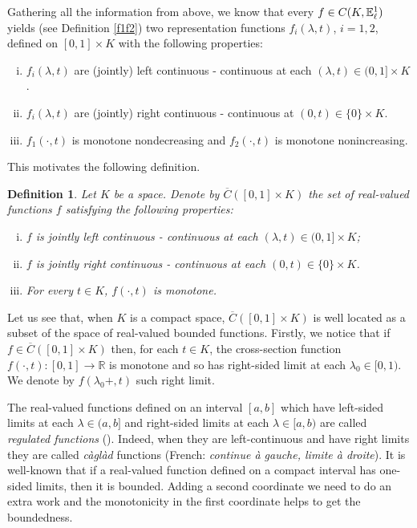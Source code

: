 \documentclass{amsart}
\newtheorem{definition}[theorem]{Definition}
\newcommand{\R}{{\mathbb{R}}}
\newcommand{\fn}{\mathbb{E}\sp{1}}
\begin{document}
\medskip
Gathering all the information from above, we know that every $f\in C(K, \fn_{\ell})$ yields (see Definition \ref{f1f2}) two representation functions
$f_i(\lambda,t)$, $i=1,2$, defined on $[0,1]\times K$ with the following properties:
\begin{enumerate}[(i)]
\item $f_i(\lambda,t)$ are (jointly) left continuous - continuous at each $(\lambda,t)\in(0,1]\times K$.
\item $f_i(\lambda,t)$ are (jointly) right continuous - continuous at $(0,t)\in \{0\}\times K$.
\item $f_1(\cdot,t)$ is monotone nondecreasing  and $f_2(\cdot,t)$ is monotone nonincreasing.
\end{enumerate}

This motivates the following definition.

\begin{definition} \label{mainDefinition}
Let $K$ be a space.
Denote by $\overline{C}([0,1]\times K)$ the set of real-valued functions $f$ satisfying the following properties:
\begin{enumerate}[(i)]
\item $f$ is jointly left continuous - continuous at each $(\lambda,t)\in(0,1]\times K$;
\item $f$ is jointly right continuous - continuous at each $(0,t)\in\{0\}\times K$.
\item For every $t\in K$, $f(\cdot,t)$ is monotone.
\end{enumerate}
\end{definition}

Let us see that, when $K$ is a compact space,  $\overline{C}([0,1]\times K)$ is well located as a subset of the space of real-valued bounded functions.
Firstly, we notice that if $f \in \overline{C}([0,1]\times K)$ then,
for each $t\in K$, the cross-section function $f(\cdot,t):[0,1]\rightarrow \R$
is monotone and so has right-sided limit at each $\lambda_0\in [0,1)$.
We denote by $f(\lambda_0+,t)$ such right limit.

The real-valued functions defined on an interval $[a,b]$ which have left-sided limits at each $\lambda\in(a,b]$ and right-sided limits at each $\lambda\in[a,b)$ are called {\em regulated functions} (\cite{frankova:2019}). Indeed, when they are left-continuous and have right limits they are called \textit{c\`agl\`ad} functions (French: \textit{continue \`a gauche, limite \`a droite}).
It is well-known that if a real-valued function defined on a compact interval has one-sided limits, then it is bounded.
Adding a second coordinate we need to do an extra work and the monotonicity in the first coordinate helps to get the boundedness.
\end{document}
